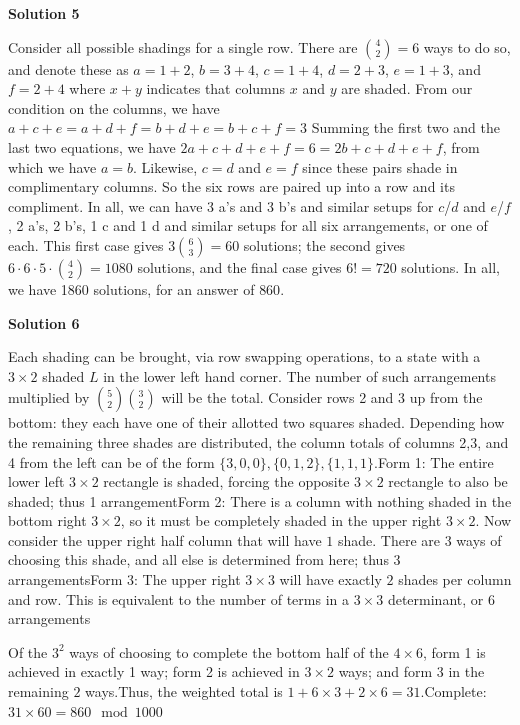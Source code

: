 \begin{enumerate}
 



\textbf{Solution 5}

Consider all possible shadings for a single row. There are ${4 \choose 2}=6$ ways to do so, and denote these as $a=1+2$, $b=3+4$, $c=1+4$, $d=2+3$, $e=1+3$, and $f=2+4$ where $x+y$ indicates that columns $x$ and $y$ are shaded. From our condition on the columns, we have $a+c+e=a+d+f=b+d+e=b+c+f=3$ Summing the first two and the last two equations, we have $2a+c+d+e+f=6=2b+c+d+e+f$, from which we have $a=b$. Likewise, $c=d$ and $e=f$ since these pairs shade in complimentary columns. So the six rows are paired up into a row and its compliment. In all, we can have 3 a's and 3 b's and similar setups for $c$/$d$ and $e$/$f$, 2 a's, 2 b's, 1 c and 1 d and similar setups for all six arrangements, or one of each. This first case gives $3{6 \choose 3}=60$ solutions; the second gives $6\cdot 6\cdot5\cdot{4 \choose 2}=1080$ solutions, and the final case gives $6!=720$ solutions. In all, we have 1860 solutions, for an answer of $860$.

 



\textbf{Solution 6}

Each shading can be brought, via row swapping operations, to a state with a $3\times2$ shaded $L$ in the lower left hand corner. The number of such arrangements multiplied by ${5 \choose 2}{3\choose 2}$ will be the total. Consider rows 2 and 3 up from the bottom: they each have one of their allotted two squares shaded. Depending how the remaining three shades are distributed, the column totals of columns 2,3, and 4 from the left can be of the form $\{3,0,0\},\{0,1,2\},\{1,1,1\}$.Form 1: The entire lower left $3\times2$ rectangle is shaded, forcing the opposite $3\times2$ rectangle to also be shaded; thus 1 arrangementForm 2: There is a column with nothing shaded in the bottom right $3\times2$, so it must be completely shaded in the upper right $3\times2$. Now consider the upper right half column that will have $1$ shade. There are $3$ ways of choosing this shade, and all else is determined from here; thus 3 arrangementsForm 3: The upper right $3\times3$ will have exactly $2$ shades per column and row. This is equivalent to the number of terms in a $3\times3$ determinant, or $6$ arrangements

 Of the $3^2$ ways of choosing to complete the bottom half of the $4\times6$, form 1 is achieved in exactly 1 way; form 2 is achieved in $3\times2$ ways; and form $3$ in the remaining $2$ ways.Thus, the weighted total is $1+6\times3+2\times6=31$.Complete: $31\times60=860\mod{1000}$





\end{enumerate}
